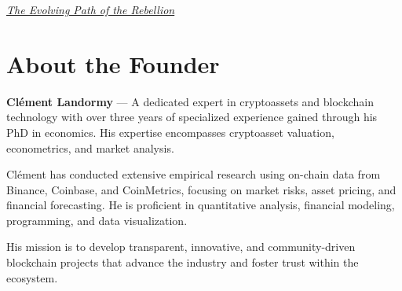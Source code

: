 \documentclass{article}
\begin{document}
\begin{center}
\end{center}
\vspace{0.5em}
\begin{center}
\textit{\underline{The Evolving Path of the Rebellion}}
\end{center}
\vspace{1em}

\vspace{1em}

\section[
\texorpdfstring{\color{primaryColor}About the Founder}{About the Founder}
]{\color{primaryColor}\textbf{About the Founder}}

\begin{tcolorbox}[colback=headerColor!10!white, colframe=headerColor, boxrule=0.8mm, width=\textwidth]
\textbf{Clément Landormy} — A dedicated expert in cryptoassets and blockchain technology with over three years of specialized experience gained through his PhD in economics. His expertise encompasses cryptoasset valuation, econometrics, and market analysis.

Clément has conducted extensive empirical research using on-chain data from Binance, Coinbase, and CoinMetrics, focusing on market risks, asset pricing, and financial forecasting. He is proficient in quantitative analysis, financial modeling, programming, and data visualization.

His mission is to develop transparent, innovative, and community-driven blockchain projects that advance the industry and foster trust within the ecosystem.
\end{tcolorbox}

\vspace{1em}
\end{document}
